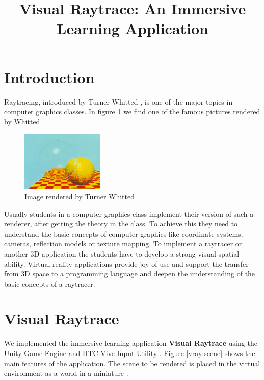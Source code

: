 \documentclass{VRARWorkshop}
\title{Visual Raytrace: An Immersive Learning Application}
\begin{document}

\section{Introduction}
Raytracing, introduced by Turner Whitted \cite{whitted_80}, is one of the major topics in
computer graphics classes.
In figure \ref{intro:whitted} we find one of the famous pictures rendered by Whitted.

\begin{figure}[h!]
    \begin{center}
        \includegraphics[width=0.35\textwidth]{whitted02.jpg}
        \caption{\label{intro:whitted} Image rendered by Turner Whitted \cite{checkerSpheres}}
    \end{center}
\end{figure}
Usually students in a computer graphics class implement their version of such a renderer,
after getting the theory in the class.
To achieve this they need to understand the basic concepts of computer graphics like coordinate systems,
cameras, reflection models or texture mapping. To implement a raytracer or another 3D application the students have to
develop a strong visual-spatial ability. Virtual reality applications provide joy of use and support the transfer
from 3D space to a programming language and deepen the understanding of the basic concepts of a raytracer.
%
\section{Visual Raytrace}
We implemented the immersive learning application \textbf{Visual Raytrace} \cite{saerota_21, visualraytrace} using the Unity Game Engine
and HTC Vive Input Utility \cite{viveInput}. Figure \ref{vray:scene} shows the main features of the application.
The scene to be rendered is placed in the virtual environment as a world in a miniature \cite{pausch_95}.
\end{document}
